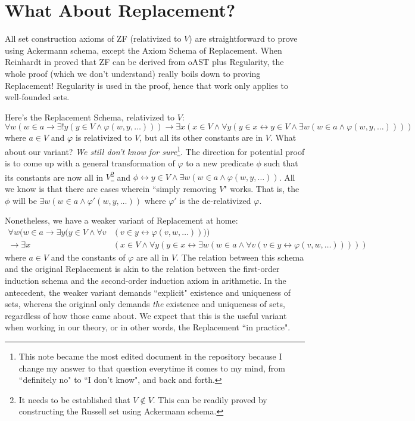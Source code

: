 \documentclass{article}
\begin{document}
\section{What About Replacement?}
All set construction axioms of \textsf{ZF} (relativized to $V$) are straightforward to prove using Ackermann schema, except the Axiom Schema of Replacement. When Reinhardt in \cite{reinhardt} proved that \textsf{ZF} can be derived from \textsf{oAST} plus Regularity, the whole proof (which we don't understand) really boils down to proving Replacement! Regularity is used in the proof, hence that work only applies to well-founded sets.

Here's the Replacement Schema, relativized to $V$:
$$\forall w(w \in a \rightarrow \exists! y(y \in V \wedge \varphi(w, y, \ldots))) \rightarrow \exists x(x \in V \wedge \forall y(y \in x \leftrightarrow y \in V \wedge \exists w(w \in a \wedge \varphi(w, y, \ldots))))$$
where $a \in V$ and $\varphi$ is relativized to $V$, but all its other constants are in $V$. What about our variant? \textit{We still don't know for sure}\footnote{This note became the most edited document in the repository because I change my answer to that question everytime it comes to my mind, from ``definitely no" to ``I don't know", and back and forth.}. The direction for potential proof is to come up with a general transformation of $\varphi$ to a new predicate $\phi$ such that its constants are now all in $V$\footnote{It needs to be established that $V\notin V$. This can be readily proved by constructing the Russell set using Ackermann schema.} and $\phi \leftrightarrow y \in V \wedge \exists w( w \in a \wedge \varphi(w, y, \ldots))$. All we know is that there are cases wherein ``simply removing $V$" works. That is, the $\phi$ will be $\exists w( w \in a \wedge \varphi'(w, y, \ldots))$ where $\varphi'$ is the de-relativized $\varphi$.

Nonetheless, we have a weaker variant of Replacement at home:
\begin{align*}
    \forall w(w \in a \rightarrow \exists y(y \in V \wedge \forall v &(v \in y \leftrightarrow \varphi(v, w, \ldots)))) \\ \rightarrow \exists x &(x \in V \wedge \forall y(y \in x \leftrightarrow \exists w(w \in a \wedge \forall v (v \in y \leftrightarrow \varphi(v, w, \ldots)))))
\end{align*}
where $a \in V$ and the constants of $\varphi$ are all in $V$. The relation between this schema and the original Replacement is akin to the relation between the first-order induction schema and the second-order induction axiom in arithmetic. In the antecedent, the weaker variant demands ``explicit" existence and uniqueness of sets, whereas the original only demands \textit{the} existence and uniqueness of sets, regardless of how those came about. We expect that this is the useful variant when working in our theory, or in other words, the Replacement ``in practice".



\end{document}
